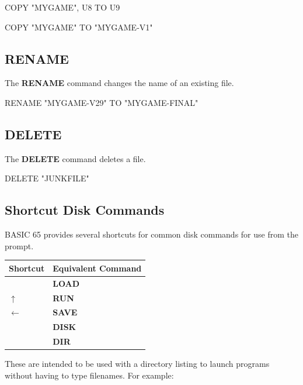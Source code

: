 \begin{screencode}
COPY "MYGAME", U8 TO U9

COPY "MYGAME" TO "MYGAME-V1"
\end{screencode}

\subsection{RENAME}

The {\bf RENAME} command changes the name of an existing file.

\begin{screencode}
RENAME "MYGAME-V29" TO "MYGAME-FINAL"
\end{screencode}

\subsection{DELETE}

The {\bf DELETE} command deletes a file.

\begin{screencode}
DELETE "JUNKFILE"
\end{screencode}


\subsection{Shortcut Disk Commands}

BASIC 65 provides several shortcuts for common disk commands for use from the  prompt.

\begin{center}
\begin{tabular}{|l|l|}
\hline
{\bf Shortcut} & {\bf Equivalent Command} \\
\hline
\screentextwide{/} & {\bf LOAD} \\
\hline
$\uparrow$ & {\bf RUN} \\
\hline
$\leftarrow$ & {\bf SAVE} \\
\hline
\screentextwide{@} & {\bf DISK} \\
\hline
\screentextwide{\$} & {\bf DIR} \\
\hline
\end{tabular}
\end{center}

These are intended to be used with a directory listing to launch programs without having to type filenames. For example:

